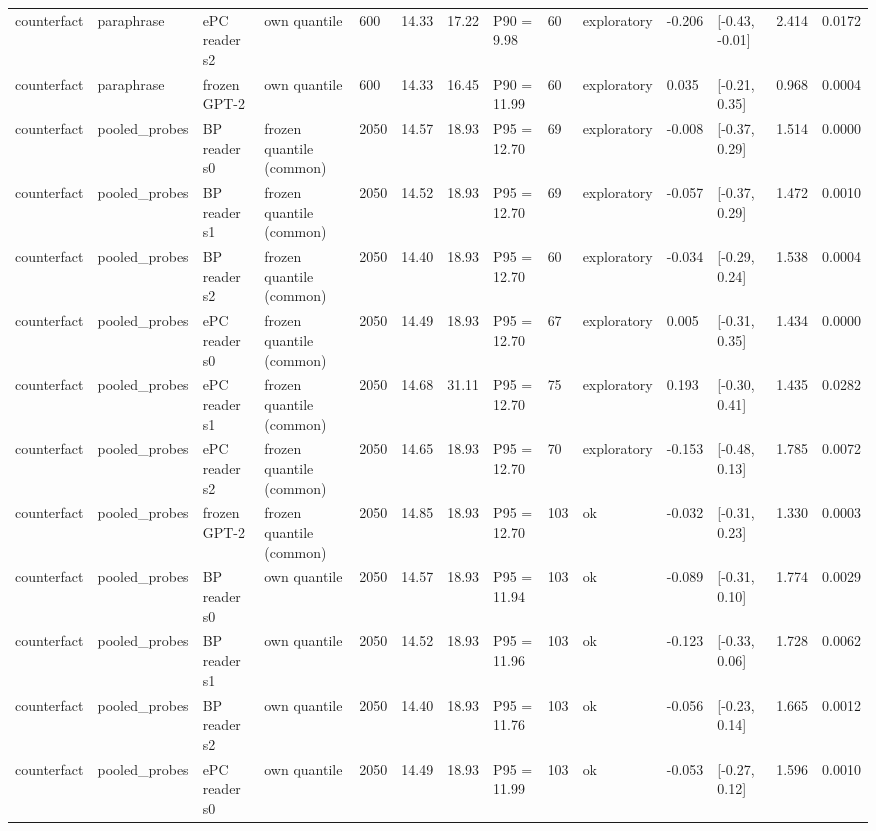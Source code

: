 \documentclass[10pt,a4paper]{article}
\begin{document}
\begin{center}
\begin{tabularx}{\textwidth}{@{}p{}XXXXXXXXXXXXX@{}}
counterfact & paraphrase & ePC reader s2 & own quantile & 600 & 14.33 & 17.22 & P90 = 9.98 & 60 & exploratory & -0.206 & [-0.43, -0.01] & 2.414 & 0.0172 \\
counterfact & paraphrase & frozen GPT-2 & own quantile & 600 & 14.33 & 16.45 & P90 = 11.99 & 60 & exploratory & 0.035 & [-0.21, 0.35] & 0.968 & 0.0004 \\
counterfact & pooled\_probes & BP reader s0 & frozen quantile (common) & 2050 & 14.57 & 18.93 & P95 = 12.70 & 69 & exploratory & -0.008 & [-0.37, 0.29] & 1.514 & 0.0000 \\
counterfact & pooled\_probes & BP reader s1 & frozen quantile (common) & 2050 & 14.52 & 18.93 & P95 = 12.70 & 69 & exploratory & -0.057 & [-0.37, 0.29] & 1.472 & 0.0010 \\
counterfact & pooled\_probes & BP reader s2 & frozen quantile (common) & 2050 & 14.40 & 18.93 & P95 = 12.70 & 60 & exploratory & -0.034 & [-0.29, 0.24] & 1.538 & 0.0004 \\
counterfact & pooled\_probes & ePC reader s0 & frozen quantile (common) & 2050 & 14.49 & 18.93 & P95 = 12.70 & 67 & exploratory & 0.005 & [-0.31, 0.35] & 1.434 & 0.0000 \\
counterfact & pooled\_probes & ePC reader s1 & frozen quantile (common) & 2050 & 14.68 & 31.11 & P95 = 12.70 & 75 & exploratory & 0.193 & [-0.30, 0.41] & 1.435 & 0.0282 \\
counterfact & pooled\_probes & ePC reader s2 & frozen quantile (common) & 2050 & 14.65 & 18.93 & P95 = 12.70 & 70 & exploratory & -0.153 & [-0.48, 0.13] & 1.785 & 0.0072 \\
counterfact & pooled\_probes & frozen GPT-2 & frozen quantile (common) & 2050 & 14.85 & 18.93 & P95 = 12.70 & 103 & ok & -0.032 & [-0.31, 0.23] & 1.330 & 0.0003 \\
counterfact & pooled\_probes & BP reader s0 & own quantile & 2050 & 14.57 & 18.93 & P95 = 11.94 & 103 & ok & -0.089 & [-0.31, 0.10] & 1.774 & 0.0029 \\
counterfact & pooled\_probes & BP reader s1 & own quantile & 2050 & 14.52 & 18.93 & P95 = 11.96 & 103 & ok & -0.123 & [-0.33, 0.06] & 1.728 & 0.0062 \\
counterfact & pooled\_probes & BP reader s2 & own quantile & 2050 & 14.40 & 18.93 & P95 = 11.76 & 103 & ok & -0.056 & [-0.23, 0.14] & 1.665 & 0.0012 \\
counterfact & pooled\_probes & ePC reader s0 & own quantile & 2050 & 14.49 & 18.93 & P95 = 11.99 & 103 & ok & -0.053 & [-0.27, 0.12] & 1.596 & 0.0010 \\

\end{tabularx}
\end{center}
\end{document}
